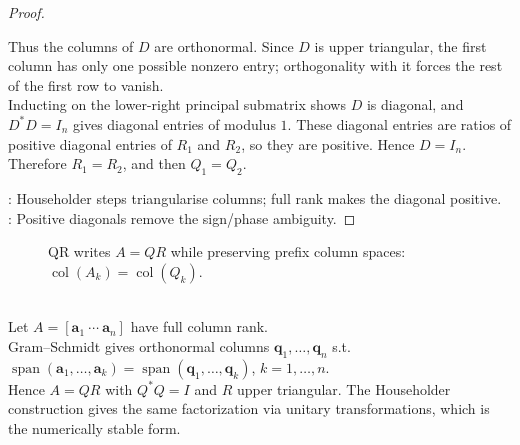 \begin{theorem}
\begin{proof}
\begin{enumerate}[label=(\roman*)]
Thus the columns of $D$ are orthonormal. Since $D$ is upper triangular, the first column has only one possible nonzero entry; orthogonality with it forces the rest of the first row to vanish.\\
Inducting on the lower-right principal submatrix shows $D$ is diagonal, and $D^*D=I_n$ gives diagonal entries of modulus $1$. These diagonal entries are ratios of positive diagonal entries of $R_1$ and $R_2$, so they are positive. Hence $D=I_n$. Therefore $R_1=R_2$, and then $Q_1=Q_2$.
\end{enumerate}
: Householder steps triangularise columns; full rank makes the diagonal positive.\\
: Positive diagonals remove the sign/phase ambiguity.
\end{proof}
\end{theorem}

\begin{figure}[H]
  \centering
  
  \caption{QR writes $A=QR$ while preserving prefix column spaces: $\operatorname{col}(A_k)=\operatorname{col}(Q_k)$.}
  \label{fig:qr-factorization-geometry}
\end{figure}

\begin{perspective} \label{per:gram-schmidt-householder-qr} \\
Let $A=[\mathbf{a}_1\ \cdots\ \mathbf{a}_n]$ have full column rank.\\
Gram--Schmidt gives orthonormal columns $\mathbf{q}_1,\ldots,\mathbf{q}_n$ s.t. $\operatorname{span}(\mathbf{a}_1,\ldots,\mathbf{a}_k)=\operatorname{span}(\mathbf{q}_1,\ldots,\mathbf{q}_k)$, $k=1,\ldots,n$.\\
Hence $A=QR$ with $Q^*Q=I$ and $R$ upper triangular. The Householder construction gives the same factorization via unitary transformations, which is the numerically stable form.
\end{perspective}

